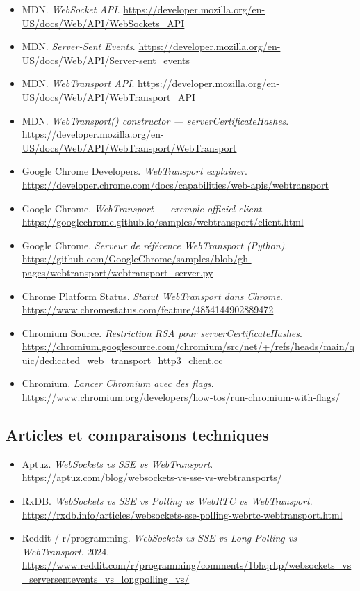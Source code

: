\begin{itemize}
    \item MDN. \textit{WebSocket API}. \url{https://developer.mozilla.org/en-US/docs/Web/API/WebSockets_API}
    \item MDN. \textit{Server-Sent Events}. \url{https://developer.mozilla.org/en-US/docs/Web/API/Server-sent_events}
    \item MDN. \textit{WebTransport API}. \url{https://developer.mozilla.org/en-US/docs/Web/API/WebTransport_API}
    \item MDN. \textit{WebTransport() constructor --- serverCertificateHashes}. \url{https://developer.mozilla.org/en-US/docs/Web/API/WebTransport/WebTransport}
    \item Google Chrome Developers. \textit{WebTransport explainer}. \url{https://developer.chrome.com/docs/capabilities/web-apis/webtransport}
    \item Google Chrome. \textit{WebTransport --- exemple officiel client}. \url{https://googlechrome.github.io/samples/webtransport/client.html}
    \item Google Chrome. \textit{Serveur de référence WebTransport (Python)}. \url{https://github.com/GoogleChrome/samples/blob/gh-pages/webtransport/webtransport_server.py}
    \item Chrome Platform Status. \textit{Statut WebTransport dans Chrome}. \url{https://www.chromestatus.com/feature/4854144902889472}
    \item Chromium Source. \textit{Restriction RSA pour serverCertificateHashes}. \url{https://chromium.googlesource.com/chromium/src/net/+/refs/heads/main/quic/dedicated_web_transport_http3_client.cc}
    \item Chromium. \textit{Lancer Chromium avec des flags}. \url{https://www.chromium.org/developers/how-tos/run-chromium-with-flags/}
\end{itemize}

\subsection*{Articles et comparaisons techniques}

\begin{itemize}
    \item Aptuz. \textit{WebSockets vs SSE vs WebTransport}. \url{https://aptuz.com/blog/websockets-vs-sse-vs-webtransports/}
    \item RxDB. \textit{WebSockets vs SSE vs Polling vs WebRTC vs WebTransport}. \url{https://rxdb.info/articles/websockets-sse-polling-webrtc-webtransport.html}
    \item Reddit / r/programming. \textit{WebSockets vs SSE vs Long Polling vs WebTransport}. 2024. \url{https://www.reddit.com/r/programming/comments/1bhqrhp/websockets_vs_serversentevents_vs_longpolling_vs/}
\end{itemize}

